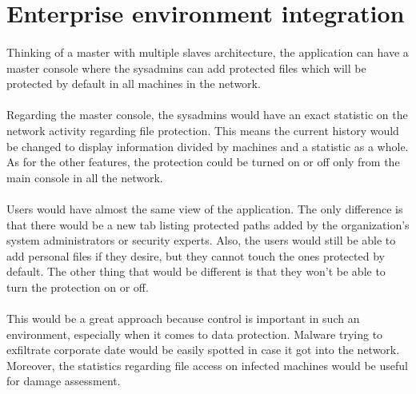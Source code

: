 \section{Enterprise environment integration}
\paragraph{}
Thinking of a master with multiple slaves architecture, the application can have a master console where the sysadmins can add protected files which will be protected by default in all machines in the network. 

\paragraph{}
Regarding the master console, the sysadmins would have an exact statistic on the network activity regarding file protection. This means the current history would be changed to display information divided by machines and a statistic as a whole. As for the other features, the protection could be turned on or off only from the main console in all the network.

\paragraph{}
Users would have almost the same view of the application. The only difference is that there would be a new tab listing protected paths added by the organization's system administrators or security experts. Also, the users would still be able to add personal files if they desire, but they cannot touch the ones protected by default. The other thing that would be different is that they won't be able to turn the protection on or off.

\paragraph{}
This would be a great approach because control is important in such an environment, especially when it comes to data protection. Malware trying to exfiltrate corporate date would be easily spotted in case it got into the network. Moreover, the statistics regarding file access on infected machines would be useful for damage assessment.


